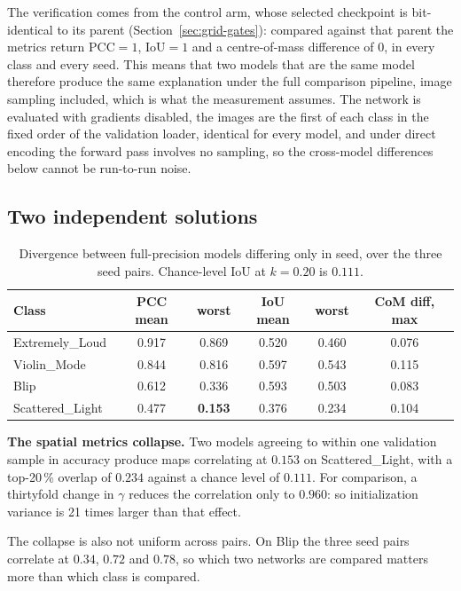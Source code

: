 The verification comes from the control arm, whose selected checkpoint is
bit-identical to its parent (Section~\ref{sec:grid-gates}): compared against that
parent the metrics return $\mathrm{PCC} = 1$, $\mathrm{IoU} = 1$ and a
centre-of-mass difference of $0$, in every class and every seed. This means that two models that
are the same model therefore produce the same explanation under the full
comparison pipeline, image sampling included, which is what the measurement
assumes. The network is evaluated with gradients disabled, the images are the
first of each class in the fixed order of the validation loader, identical for
every model, and under direct encoding the forward pass involves no sampling, so
the cross-model differences below cannot be run-to-run noise.

\subsection{Two independent solutions}

\begin{table}[htbp]
\centering
\begin{tabular}{lccccc}
\toprule
Class & PCC mean & worst & IoU mean & worst & CoM diff, max \\
\midrule
Extremely\_Loud & 0.917 & 0.869 & 0.520 & 0.460 & 0.076 \\
Violin\_Mode & 0.844 & 0.816 & 0.597 & 0.543 & 0.115 \\
Blip & 0.612 & 0.336 & 0.593 & 0.503 & 0.083 \\
Scattered\_Light & 0.477 & \textbf{0.153} & 0.376 & 0.234 & 0.104 \\
\bottomrule
\end{tabular}
\caption{Divergence between full-precision models differing only in seed, over
the three seed pairs. Chance-level IoU at $k = 0.20$ is $0.111$.}
\label{tab:seeds}
\end{table}

\textbf{The spatial metrics collapse.} Two models agreeing to within one
validation sample in accuracy produce maps correlating at $0.153$ on
Scattered\_Light, with a top-20\,\% overlap of $0.234$ against a chance level of
$0.111$. For comparison, a thirtyfold change in $\gamma$ reduces the correlation
only to $0.960$: so initialization variance is 21 times larger than that effect.

The collapse is also not uniform across pairs. On Blip the three seed pairs
correlate at $0.34$, $0.72$ and $0.78$, so which two networks are compared
matters more than which class is compared.


